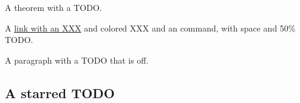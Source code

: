 \documentclass[11pt]{article}
\begin{document}
\begin{theorem}[XXX]
A theorem with a TODO.
\end{theorem}

A \href{https://example.com/TODO}{link with an XXX} and
\textcolor{TODO}{colored XXX} and an  command,
with space\vspace{2TODO} and 50\% TODO.


A paragraph with a TODO that is off.


\subsection*{A starred TODO}
\end{document}
